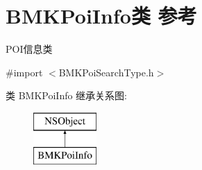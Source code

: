 \hypertarget{interface_b_m_k_poi_info}{\section{B\+M\+K\+Poi\+Info类 参考}
\label{interface_b_m_k_poi_info}
}


P\+O\+I信息类  




{\ttfamily \#import $<$B\+M\+K\+Poi\+Search\+Type.\+h$>$}

类 B\+M\+K\+Poi\+Info 继承关系图\+:\begin{figure}[H]
\begin{center}
\leavevmode
\includegraphics[height=2.000000cm]{interface_b_m_k_poi_info}
\end{center}
\end{figure}
